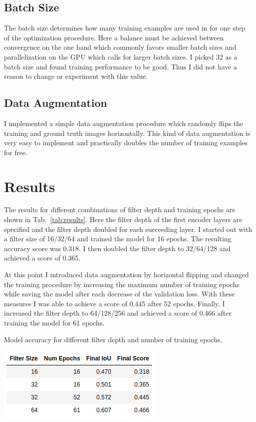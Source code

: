 \documentclass[twoside, twocolumn]{article}
\newcommand{\tabref}[1]{Tab.~\ref{tab:#1}}
\begin{document}
\subsection{Batch Size}
The batch size determines how many training examples are used in for one step of
the optimization procedure. Here a balance must be achieved between convergence
on the one hand which commonly favors smaller batch sizes and parallelization on
the GPU which calls for larger batch sizes. I picked 32 as a batch size and found
training performance to be good. Thus I did not have a reason to change or
experiment with this value.

\subsection{Data Augmentation}
I implemented a simple data augmentation procedure which randomly flips the training and
ground truth images horizontally. This kind of data augmentation is very easy
to implement and practically doubles the number of training examples for free.


\section{Results}
The results for different combinations of filter depth and training epochs are
shown in \tabref{results}. Here the filter depth of the first encoder layers are
specified and the filter depth doubled for each succeeding layer. I started out
with a filter size of 16/32/64 and trained the model for 16 epochs. The resulting
accuracy score was 0.318. I then doubled the filter depth to 32/64/128 and achieved
a score of 0.365.

At this point I introduced data augmentation by horizontal flipping and changed
the training procedure by increasing the maximum number of training epochs while
saving the model after each decrease of the validation loss. With these measures
I was able to achieve a score of 0.445 after 52 epochs. Finally, I increased the filter depth
to 64/128/256 and achieved a score of 0.466 after training the model for 61 epochs.

\begin{table}[ht]
\centering
\caption{\label{tab:results} Model accuracy for different filter depth and number of training epochs.}
\includegraphics[width=\columnwidth]{fig/results.png}
\end{table}
\end{document}
